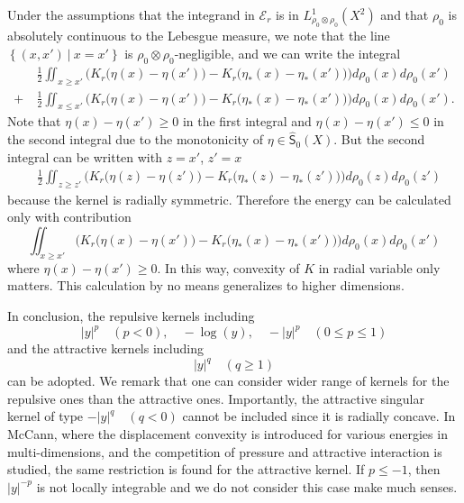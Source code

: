 \documentclass[10pt, letterpaper]{article}
\def\E{{\mathcal{E}}}
\theoremstyle{definition}
\theoremstyle{remark}
\begin{document}
Under the assumptions that the integrand in $\E_r$ is in $L^1_{\rho_0\otimes\rho_0}(X^2)$ and that $\rho_0$ is absolutely continuous to the Lebesgue measure, we note that the line $\left\{(x,x') ~|~ x=x'\right\}$ is $\rho_0\otimes\rho_0$-negligible, and we can write the integral
\begin{align*}
 &\frac{1}{2} \iint_{x\ge x'} \Big({K}_r\big(\eta(x)-\eta(x')\big) -  {{K}_r\big(\eta_*(x)-\eta_*(x')\big)}\Big) d\rho_{0}(x)d\rho_0(x')\\
 + \: &\frac{1}{2} \iint_{x\le x'} \Big({K}_r\big(\eta(x)-\eta(x')\big) -  {{K}_r\big(\eta_*(x)-\eta_*(x')\big)}\Big) d\rho_{0}(x)d\rho_0(x').
\end{align*}
Note that $\eta(x)-\eta(x')\ge 0$ in the first integral  and $\eta(x) - \eta(x')\le 0$ in the second integral due to the monotonicity of $\eta\in \hat{\textsf{S}}_0(X)$. But the second integral can be written with $z=x'$, $z'=x$
\begin{align*}
&\frac{1}{2} \iint_{z\ge z'} \Big({K}_r\big(\eta(z)-\eta(z')\big) -  {{K}_r\big(\eta_*(z)-\eta_*(z')\big)}\Big) d\rho_{0}(z)d\rho_0(z')
\end{align*}
because the kernel is radially symmetric. Therefore the energy can be calculated only with contribution
$$\iint_{x\ge x'} \Big({K}_r\big(\eta(x)-\eta(x')\big) -  {{K}_r\big(\eta_*(x)-\eta_*(x')\big)}\Big) d\rho_{0}(x)d\rho_0(x')$$
where $\eta(x)-\eta(x')\ge 0$. In this way, convexity of $K$ in radial variable only matters. This calculation by no means generalizes to higher dimensions. 

In conclusion, the repulsive kernels including
$$ |y|^{p} \quad (p<0), \quad -\log(y), \quad -|y|^p \quad (0\le p \le 1)$$ 
and the attractive kernels including
$$ |y|^q \quad (q\ge 1)$$
can be adopted. We remark that one can consider wider range of kernels for the repulsive ones than the attractive ones. Importantly, the attractive singular kernel of type $-|y|^q \quad (q<0)$ cannot be included since it is radially concave. In McCann, where the displacement convexity is introduced for various energies in multi-dimensions, and the competition of pressure and attractive interaction is studied, the same restriction is found for the attractive kernel. If $p\le -1$, then $|y|^{-p}$ is not locally integrable and we do not consider this case make much senses.
\end{document}

